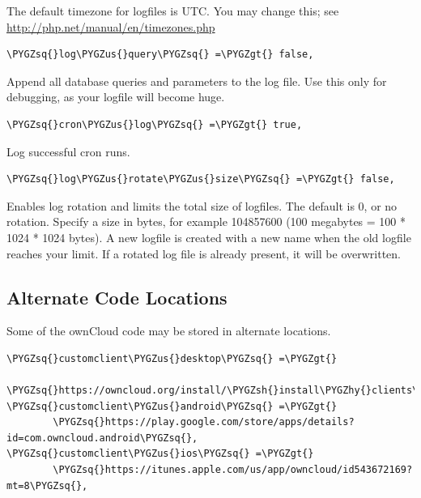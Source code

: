 \documentclass[letterpaper,10pt,english]{sphinxmanual}
\def\PYGZus{\char`\_}
\def\PYGZgt{\char`\>}
\def\PYGZsh{\char`\#}
\def\PYGZhy{\char`\-}
\def\PYGZsq{\char`\'}
\begin{document}
The default timezone for logfiles is UTC. You may change this; see
\href{http://php.net/manual/en/timezones.php}{http://php.net/manual/en/timezones.php}

\begin{Verbatim}[commandchars=\\\{\}]
\PYGZsq{}log\PYGZus{}query\PYGZsq{} =\PYGZgt{} false,
\end{Verbatim}

Append all database queries and parameters to the log file. Use this only for
debugging, as your logfile will become huge.

\begin{Verbatim}[commandchars=\\\{\}]
\PYGZsq{}cron\PYGZus{}log\PYGZsq{} =\PYGZgt{} true,
\end{Verbatim}

Log successful cron runs.

\begin{Verbatim}[commandchars=\\\{\}]
\PYGZsq{}log\PYGZus{}rotate\PYGZus{}size\PYGZsq{} =\PYGZgt{} false,
\end{Verbatim}

Enables log rotation and limits the total size of logfiles. The default is 0,
or no rotation. Specify a size in bytes, for example 104857600 (100 megabytes
= 100 * 1024 * 1024 bytes). A new logfile is created with a new name when the
old logfile reaches your limit. If a rotated log file is already present, it
will be overwritten.


\subsection{Alternate Code Locations}
\label{configuration_server/config_sample_php_parameters:alternate-code-locations}
Some of the ownCloud code may be stored in alternate locations.

\begin{Verbatim}[commandchars=\\\{\}]
\PYGZsq{}customclient\PYGZus{}desktop\PYGZsq{} =\PYGZgt{}
        \PYGZsq{}https://owncloud.org/install/\PYGZsh{}install\PYGZhy{}clients\PYGZsq{},
\PYGZsq{}customclient\PYGZus{}android\PYGZsq{} =\PYGZgt{}
        \PYGZsq{}https://play.google.com/store/apps/details?id=com.owncloud.android\PYGZsq{},
\PYGZsq{}customclient\PYGZus{}ios\PYGZsq{} =\PYGZgt{}
        \PYGZsq{}https://itunes.apple.com/us/app/owncloud/id543672169?mt=8\PYGZsq{},
\end{Verbatim}
\end{document}
